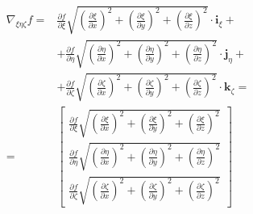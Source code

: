 \documentclass
[
a4paper,                      %
twoside,					  %
12pt,                         %
abstract,		      %
fleqn,                        %
]
{scrartcl} %
\begin{document}
\begin{equation}
\begin{aligned}
\nabla_{\xi\eta\zeta} f=&\frac{\partial f}{\partial\xi}\sqrt{\left(\frac{\partial\xi}{\partial x}\right)^{2}+\left(\frac{\partial\xi}{\partial y}\right)^{2}+\left(\frac{\partial\xi}{\partial z}\right)^{2}}\cdot\mathbf{i}_{\xi}+\\
&+\frac{\partial f}{\partial\eta}\sqrt{\left(\frac{\partial\eta}{\partial x}\right)^{2}+\left(\frac{\partial\eta}{\partial y}\right)^{2}+\left(\frac{\partial\eta}{\partial z}\right)^{2}}\cdot\mathbf{j}_{\eta}+\\
&+\frac{\partial f}{\partial\zeta}\sqrt{\left(\frac{\partial\zeta}{\partial x}\right)^{2}+\left(\frac{\partial\zeta}{\partial y}\right)^{2}+\left(\frac{\partial\zeta}{\partial z}\right)^{2}}\cdot\mathbf{k}_{\zeta}=\\
=&\begin{bmatrix}
\frac{\partial f}{\partial\xi}\sqrt{\left(\frac{\partial\xi}{\partial x}\right)^{2}+\left(\frac{\partial\xi}{\partial y}\right)^{2}+\left(\frac{\partial\xi}{\partial z}\right)^{2}}\\[10pt]
\frac{\partial f}{\partial\eta}\sqrt{\left(\frac{\partial\eta}{\partial x}\right)^{2}+\left(\frac{\partial\eta}{\partial y}\right)^{2}+\left(\frac{\partial\eta}{\partial z}\right)^{2}}\\[10pt]
\frac{\partial f}{\partial\zeta}\sqrt{\left(\frac{\partial\zeta}{\partial x}\right)^{2}+\left(\frac{\partial\zeta}{\partial y}\right)^{2}+\left(\frac{\partial\zeta}{\partial z}\right)^{2}}
\end{bmatrix}
\end{aligned}
\end{equation}
\end{document}
